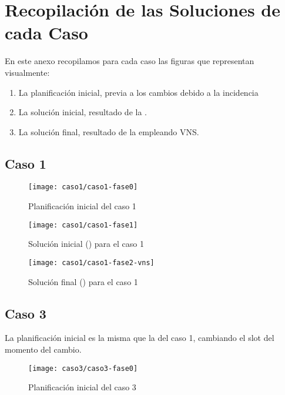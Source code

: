 \graphicspath{{anexos/AnexoF-Recopilacion-Soluciones-Por-Fases/recursos/}}

\section{Recopilación de las Soluciones de cada Caso} \label{Anexo:recopilacion-soluciones-por-fases}

En este anexo recopilamos para cada caso las figuras que representan visualmente:
\begin{enumerate}
	\item La planificación inicial, previa a los cambios debido a la incidencia
	\item La solución inicial, resultado de la \faseuno{}.
	\item La solución final, resultado de la \fasedos{} empleando VNS. 
\end{enumerate}


\newpage
\subsection{Caso 1}

\begin{figure}[!h]
	\centering
	\texttt{[image: caso1/caso1-fase0]}
	\caption{Planificación inicial del caso 1}
	\label{fig:caso1-fase0}
\end{figure}

\begin{figure}[!h]
	\centering
	\texttt{[image: caso1/caso1-fase1]}
	\caption{Solución inicial (\faseuno{}) para el caso 1}
	\label{fig:caso1-fase1}
\end{figure}

\begin{figure}[!h]
	\centering
	\texttt{[image: caso1/caso1-fase2-vns]}
	\caption{Solución final (\fasedos{}) para el caso 1}
	\label{fig:caso1-fase2}
\end{figure}

\FloatBarrier
\newpage
\subsection{Caso 3}

La planificación inicial es la misma que la del caso 1, cambiando el slot del momento del cambio.

\begin{figure}[!h]
	\centering
	\texttt{[image: caso3/caso3-fase0]}
	\caption{Planificación inicial del caso 3}
	\label{fig:caso3-fase0}
\end{figure}


